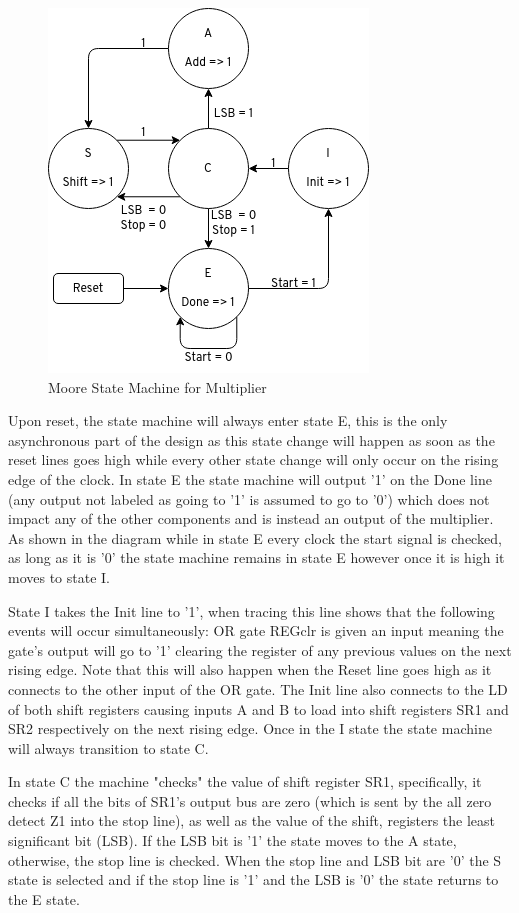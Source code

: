 \documentclass[11pt]{article}
\begin{document}
\begin{figure}[H]        
    \centering
    \includegraphics[width=.5\textwidth]{StateMachine.png}
    \caption{Moore State Machine for Multiplier}
    \label{fig:msm}
\end{figure} 

Upon reset, the state machine will always enter state E,
this is the only asynchronous part of the design as this state change will happen as soon as the reset lines goes high while every other state change will only occur on the rising edge of the clock.
In state E the state machine will output '1' on the Done line (any output not labeled as going to '1' is assumed to go to '0') which does not impact any of the other components and is instead an output of the multiplier.
As shown in the diagram while in state E every clock the start signal is checked, as long as it is '0' the state machine remains in state E however once it is high it moves to state I.

State I takes the Init line to '1', when tracing this line shows that the following events will occur simultaneously: OR gate REGclr is given an input meaning the gate's output will go to '1' clearing the register of any previous values on the next rising edge.
Note that this will also happen when the Reset line goes high as it connects to the other input of the OR gate. 
The Init line also connects to the LD of both shift registers causing inputs A and B to load into shift registers SR1 and SR2 respectively on the next rising edge.
Once in the I state the state machine will always transition to state C. 

In state C the machine "checks" the value of shift register SR1,
specifically, it checks if all the bits of SR1's output bus are zero (which is sent by the all zero detect Z1 into the stop line), as well as the value of the shift, registers the least significant bit (LSB).
If the LSB bit is '1' the state moves to the A state, otherwise, the stop line is checked.
When the stop line and LSB bit are '0' the S state is selected and if the stop line is '1' and the LSB is '0' the state returns to the E state.
\end{document}
